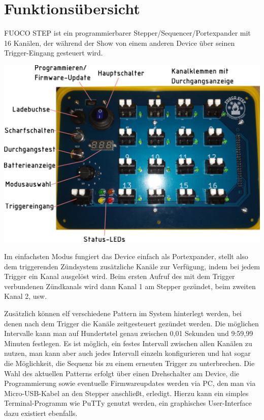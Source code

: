 \documentclass[paper=a4, open=any]{scrbook}
\begin{document}
		\chapter{Funktionsübersicht}

			FUOCO STEP ist ein programmierbarer Stepper/Sequencer/Portexpander mit 16 Kanälen, der während der Show von einem anderen Device über seinen Trigger-Eingang gesteuert wird.

			\begin{center}
				\includegraphics[width=\textwidth]{oberflaeche}
				\label{fig:paneldescription}
			\end{center}

			Im einfachsten Modus fungiert das Device einfach als Portexpander, stellt also dem triggerenden Zündsystem zusätzliche Kanäle zur Verfügung, indem bei jedem Trigger ein Kanal ausgelöst wird. Beim ersten Aufruf des mit dem Trigger verbundenen Zündkanals wird dann Kanal 1 am Stepper gezündet, beim zweiten Kanal 2, usw.

			Zusätzlich können elf verschiedene Pattern im System hinterlegt werden, bei denen nach dem Trigger die Kanäle zeitgesteuert gezündet werden. Die möglichen Intervalle kann man auf Hundertstel genau zwischen 0,01 Sekunden und 9:59,99 Minuten festlegen. Es ist möglich, ein festes Intervall zwischen allen Kanälen zu nutzen, man kann aber auch jedes Intervall einzeln konfigurieren und hat sogar die Möglichkeit, die Sequenz bis zu einem erneuten Trigger zu unterbrechen. Die Wahl des aktuellen Patterns erfolgt über einen Drehschalter am Device, die Programmierung sowie eventuelle Firmwareupdates werden via PC, den man via Micro-USB-Kabel an den Stepper anschließt, erledigt. Hierzu kann ein simples Terminal-Programm wie PuTTy genutzt werden, ein graphisches User-Interface dazu existiert ebenfalls.
\end{document}
